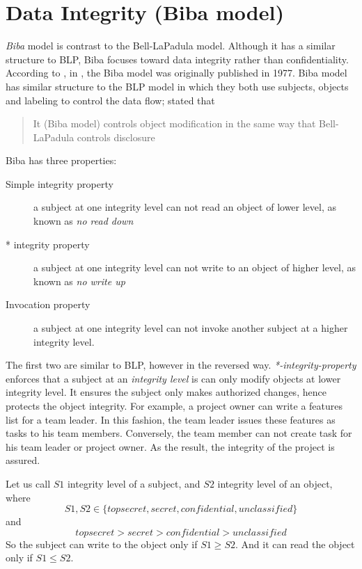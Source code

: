 
\section{Data Integrity (Biba model)}
\label{ch:background:biba}

\emph{Biba} model is contrast to the Bell-LaPadula model.
Although it has a similar structure to BLP, Biba focuses toward data integrity rather than confidentiality.
According to \citeauthor{michael:2012}, in \cite{michael:2012}, the Biba model was originally published in 1977.
Biba model has similar structure to the BLP model in which they both use subjects, objects and labeling to control the data flow;
\cite{micki:1997} stated that 
\begin{quote}
It (Biba model) controls object modification in the same way that Bell-LaPadula controls disclosure
\end{quote}
Biba has three properties:
\begin{description}
\item[Simple integrity property] a subject at one integrity level can not read an object of lower level, as known as \emph{no read down}
\item[* integrity property] a subject at one integrity level can not write to an object of higher level, as known as \emph{no write up}
\item[Invocation property] a subject at one integrity level can not invoke another subject at a higher integrity level.
\end{description}
The first two are similar to BLP, however in the reversed way.
\emph{*-integrity-property} enforces that a subject at an \emph{integrity level} is can only modify objects at lower integrity level.
It ensures the subject only makes authorized changes, hence protects the object integrity.
For example, a project owner can write a features list for a team leader.
In this fashion, the team leader issues these features as tasks to his team members.
Conversely, the team member can not create task for his team leader or project owner.
As the result, the integrity of the project is assured.

Let us call $S1$ integrity level of a subject, and $S2$ integrity level of an object, where 
$$S1,S2 \in \{top secret, secret, confidential, unclassified\}$$ 
and 
$$top secret > secret > confidential > unclassified$$
So the subject can write to the object only if $S1 \geq S2$.
And it can read the object only if $S1 \leq S2$.

